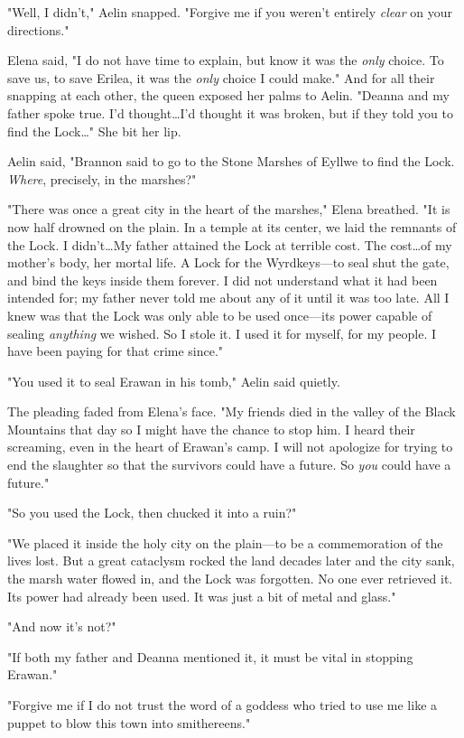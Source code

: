 "Well, I didn't," Aelin snapped.
"Forgive me if you weren't entirely \emph{clear} on your directions."

Elena said, "I do not have time to explain, but know it was the \emph{only} choice.
To save us, to save Erilea, it was the \emph{only}
choice I could make."
And for all their snapping at each other, the queen exposed her palms to Aelin.
"Deanna and my father spoke true.
I'd thought\ldots I'd thought it was broken, but if they told you to find the Lock\ldots " She bit her lip.

Aelin said, "Brannon said to go to the Stone Marshes of Eyllwe to find the Lock.
\emph{Where}, precisely, in the marshes?"

"There was once a great city in the heart of the marshes," Elena breathed.
"It is now half drowned on the plain.
In a temple at its center, we laid the remnants of the Lock.
I didn't\ldots My father attained the Lock at terrible cost.
The cost\ldots of my mother's body, her mortal life.
A Lock for the Wyrdkeys---to seal shut the gate, and bind the keys inside them forever.
I did not understand what it had been intended for; my father never told me about any of it until it was too late.
All I knew was that the Lock was only able to be used once---its power capable of sealing \emph{anything} we wished.
So I stole it.
I used it for myself, for my people.
I have been paying for that crime since."

"You used it to seal Erawan in his tomb," Aelin said quietly.

The pleading faded from Elena's face.
"My friends died in the valley of the Black Mountains that day so I might have the chance to stop him.
I heard their screaming, even in the heart of Erawan's camp.
I will not apologize for trying to end the slaughter so that the survivors could have a future.
So \emph{you} could have a future."

"So you used the Lock, then chucked it into a ruin?"

"We placed it inside the holy city on the plain---to be a commemoration of the lives lost.
But a great cataclysm rocked the land decades later  and the city sank, the marsh water flowed in, and the Lock was forgotten.
No one ever retrieved it.
Its power had already been used.
It was just a bit of metal and glass."

"And now it's not?"

"If both my father and Deanna mentioned it, it must be vital in stopping Erawan."

"Forgive me if I do not trust the word of a goddess who tried to use me like a puppet to blow this town into smithereens."


